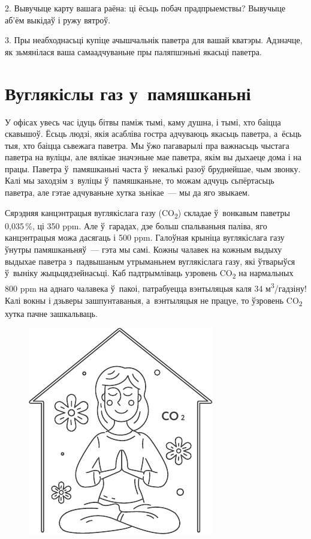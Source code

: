 2. Вывучыце карту вашага раёна: ці ёсьць побач прадпрыемствы? Вывучыце аб'ём выкідаў і ружу вятроў.

3. Пры неабходнасьці купіце ачышчальнік паветра для вашай кватэры. Адзначце, як зьмянілася ваша самаадчуваньне пры паляпшэньні якасьці паветра.


\section{Вуглякіслы газ у~памяшканьні}

У офісах увесь час ідуць бітвы паміж тымі, каму душна, і тымі, хто баіцца скавышоў. Ёсьць людзі, якія асабліва гостра адчуваюць якасьць паветра, а~ёсьць тыя, хто баіцца сьвежага паветра. Мы ўжо пагаварылі пра важнасьць чыстага паветра на вуліцы, але вялікае значэньне мае паветра, якім вы дыхаеце дома і на працы. Паветра ў~памяшканьні часта ў~некалькі разоў бруднейшае, чым звонку. Калі мы заходзім з~вуліцы ў~памяшканьне, то можам адчуць сьпёртасьць паветра, але гэтае адчуваньне хутка зьнікае~--- мы да яго звыкаем. 


Сярэдняя канцэнтрацыя вуглякіслага газу (CO\textsubscript{2}) складае ў~вонкавым паветры 0,035\,\%, ці 350 ppm. Але ў~гарадах, дзе больш спальваньня паліва, яго канцэнтрацыя можа дасягаць і 500 ppm. Галоўная крыніца вуглякіслага газу ўнутры памяшканьняў~--- гэта мы самі. Кожны чалавек на кожным выдыху выдыхае паветра з~падвышаным утрыманьнем вуглякіслага газу, які ўтварыўся ў~выніку жыцьцядзейнасьці. Каб падтрымліваць узровень CO\textsubscript{2} на нармальных 800 ppm на аднаго чалавека ў~пакоі, патрабуецца вэнтыляцыя каля 34 м\textsuperscript{3}/гадзіну! Калі вокны і дзьверы зашпунтаваныя, а~вэнтыляцыя не працуе, то ўзровень CO\textsubscript{2} хутка пачне зашкальваць.

\begin{figure}[htb!]
  \centering
  \includegraphics[scale=1.5]{willpower/ch11/6.pdf}
\end{figure}

